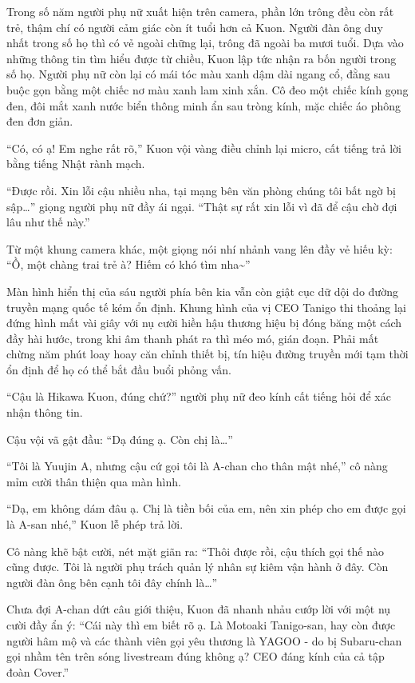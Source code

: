 \documentclass[../main.tex]{subfiles}
\begin{document}
Trong số năm người phụ nữ xuất hiện trên camera, phần lớn trông đều còn rất trẻ, thậm chí có người cảm giác còn ít tuổi hơn cả Kuon. Người đàn ông duy nhất trong số họ thì có vẻ ngoài chững lại, trông đã ngoài ba mươi tuổi. Dựa vào những thông tin tìm hiểu được từ chiều, Kuon lập tức nhận ra bốn người trong số họ. Người phụ nữ còn lại có mái tóc màu xanh dậm dài ngang cổ, đằng sau buộc gọn bằng một chiếc nơ màu xanh lam xinh xắn. Cô đeo một chiếc kính gọng đen, đôi mắt xanh nước biển thông minh ẩn sau tròng kính, mặc chiếc áo phông đen đơn giản.

``Có, có ạ! Em nghe rất rõ,'' Kuon vội vàng điều chỉnh lại micro, cất tiếng trả lời bằng tiếng Nhật rành mạch.

``Được rồi. Xin lỗi cậu nhiều nha, tại mạng bên văn phòng chúng tôi bất ngờ bị sập\dots'' giọng người phụ nữ đầy ái ngại. ``Thật sự rất xin lỗi vì đã để cậu chờ đợi lâu như thế này.''

Từ một khung camera khác, một giọng nói nhí nhảnh vang lên đầy vẻ hiếu kỳ: ``Ồ, một chàng trai trẻ à? Hiếm có khó tìm nha\~{}''

Màn hình hiển thị của sáu người phía bên kia vẫn còn giật cục dữ dội do đường truyền mạng quốc tế kém ổn định. Khung hình của vị CEO Tanigo thi thoảng lại đứng hình mất vài giây với nụ cười hiền hậu thương hiệu bị đóng băng một cách đầy hài hước, trong khi âm thanh phát ra thì méo mó, gián đoạn. Phải mất chừng năm phút loay hoay căn chỉnh thiết bị, tín hiệu đường truyền mới tạm thời ổn định để họ có thể bắt đầu buổi phỏng vấn.

``Cậu là Hikawa Kuon, đúng chứ?'' người phụ nữ đeo kính cất tiếng hỏi để xác nhận thông tin.

Cậu vội vã gật đầu: ``Dạ đúng ạ. Còn chị là\dots''

``Tôi là Yuujin A, nhưng cậu cứ gọi tôi là A-chan cho thân mật nhé,'' cô nàng mỉm cười thân thiện qua màn hình.

``Dạ, em không dám đâu ạ. Chị là tiền bối của em, nên xin phép cho em được gọi là A-san nhé,'' Kuon lễ phép trả lời.

Cô nàng khẽ bật cười, nét mặt giãn ra: ``Thôi được rồi, cậu thích gọi thế nào cũng được. Tôi là người phụ trách quản lý nhân sự kiêm vận hành ở đây. Còn người đàn ông bên cạnh tôi đây chính là\dots''

Chưa đợi A-chan dứt câu giới thiệu, Kuon đã nhanh nhảu cướp lời với một nụ cười đầy ẩn ý: ``Cái này thì em biết rõ ạ. Là Motoaki Tanigo-san, hay còn được người hâm mộ và các thành viên gọi yêu thương là YAGOO - do bị Subaru-chan gọi nhầm tên trên sóng livestream đúng không ạ? CEO đáng kính của cả tập đoàn Cover.''
\end{document}

